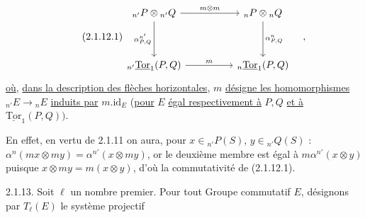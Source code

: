 \begin{equation}\tag{2.1.12.1}
\begin{tikzcd}[column sep=huge, row sep=huge]
{{}_{n'}P \otimes {}_{n'}Q} \arrow[r, "m \otimes m"] \arrow[d, "{\alpha^{n'}_{P,Q}}"'] & {{}_{n}P \otimes {}_{n}Q} \arrow[d, "{\alpha^{n}_{P,Q}}"] \\
{{}_{n'}\underline{\mathrm{Tor}}_1(P,Q)} \arrow[r, "m"] & {{}_{n}\underline{\mathrm{Tor}}_1(P,Q)}
\end{tikzcd}\quad ,
\end{equation}
\underline{où}, \underline{dans la description des flèches horizontales}, $m$ \underline{désigne les homomorphismes} ${}_{n'}E \longrightarrow {}_{n}E$ \underline{induits par} $m.\mathrm{id}_E$ (\underline{pour} $E$ \underline{égal respectivement à} $P,Q$ \underline{et à} $\underline{\mathrm{Tor}}_1(P,Q))$.

En effet, en vertu de 2.1.11 on aura, pour $x \in {}_{n'}P(S)$, $y \in {}_{n'}Q(S)$ : $\alpha^n(mx \otimes my) = \alpha^{n'}(x \otimes my)$, or le deuxième membre est égal à $m\alpha^{n'}(x \otimes y)$ puisque $x \otimes my = m(x \otimes y)$, d'où la commutativité de (2.1.12.1).



2.1.13. Soit $\ell$ un nombre premier. Pour tout Groupe commutatif $E$, désignons par $T_\ell(E)$ le système projectif

